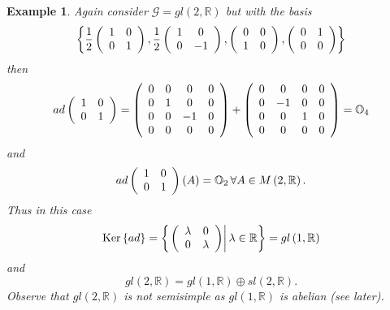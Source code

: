 \documentclass[aps,preprint]{revtex4}%
\newtheorem{example}[theorem]{Example}
\begin{document}
\begin{example}
Again consider $\mathcal{G}=gl\left(  2,\mathbb{R}\right)  $ but with the
basis
\begin{equation}
\left\{  \frac{1}{2}\left(
\begin{array}
[c]{cc}%
1 & 0\\
0 & 1
\end{array}
\right)  ,\frac{1}{2}\left(
\begin{array}
[c]{cc}%
1 & 0\\
0 & -1
\end{array}
\right)  ,\left(
\begin{array}
[c]{cc}%
0 & 0\\
1 & 0
\end{array}
\right)  ,\left(
\begin{array}
[c]{cc}%
0 & 1\\
0 & 0
\end{array}
\right)  \right\}
\end{equation}
then
\begin{equation}
ad\left(
\begin{array}
[c]{cc}%
1 & 0\\
0 & 1
\end{array}
\right)  =\left(
\begin{array}
[c]{cccc}%
0 & 0 & 0 & 0\\
0 & 1 & 0 & 0\\
0 & 0 & -1 & 0\\
0 & 0 & 0 & 0
\end{array}
\right)  +\left(
\begin{array}
[c]{cccc}%
0 & 0 & 0 & 0\\
0 & -1 & 0 & 0\\
0 & 0 & 1 & 0\\
0 & 0 & 0 & 0
\end{array}
\right)  =\mathbb{O}_{4}%
\end{equation}
and
\begin{equation}
ad\left(
\begin{array}
[c]{cc}%
1 & 0\\
0 & 1
\end{array}
\right)  \left(  A\right)  =\mathbb{O}_{2}\,\forall A\in M\left(
2,\mathbb{R}\right)  .
\end{equation}
Thus in this case%
\begin{equation}
\operatorname{Ker}\left\{  ad\right\}  =\left\{  \left.  \left(
\begin{array}
[c]{cc}%
\lambda & 0\\
0 & \lambda
\end{array}
\right)  \right\vert \lambda\in\mathbb{R}\right\}  =gl\left(  1,\mathbb{R}%
\right)
\end{equation}
and
\begin{equation}
gl\left(  2,\mathbb{R}\right)  =gl\left(  1,\mathbb{R}\right)  \oplus
sl\left(  2,\mathbb{R}\right)  .
\end{equation}
Observe that $gl\left(  2,\mathbb{R}\right)  $ is not semisimple as $gl\left(
1,\mathbb{R}\right)  $ is abelian (see later).
\end{example}
\end{document}
